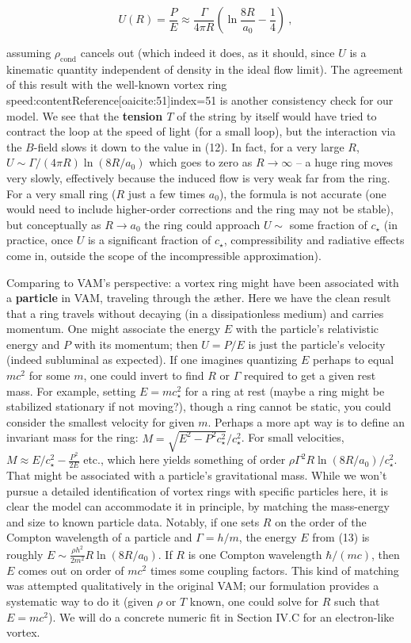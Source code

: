 \documentclass[12pt]{article}
\begin{document}
\[ U(R) = \frac{P}{E} \approx \frac{\Gamma}{4\pi R} \left(\ln\frac{8R}{a_0} - \frac{1}{4}\right)~, \] 

assuming $\rho_{\text{cond}}$ cancels out (which indeed it does, as it should, since $U$ is a kinematic quantity independent of density in the ideal flow limit). The agreement of this result with the well-known vortex ring speed:contentReference[oaicite:51]{index=51} is another consistency check for our model. We see that the \textbf{tension $T$} of the string by itself would have tried to contract the loop at the speed of light (for a small loop), but the interaction via the $B$-field slows it down to the value in (12). In fact, for a very large $R$, $U \sim \Gamma/(4\pi R)\ln(8R/a_0)$ which goes to zero as $R\to \infty$ – a huge ring moves very slowly, effectively because the induced flow is very weak far from the ring. For a very small ring ($R$ just a few times $a_0$), the formula is not accurate (one would need to include higher-order corrections and the ring may not be stable), but conceptually as $R \to a_0$ the ring could approach $U \sim$ some fraction of $c_\star$ (in practice, once $U$ is a significant fraction of $c_\star$, compressibility and radiative effects come in, outside the scope of the incompressible approximation).

Comparing to VAM’s perspective: a vortex ring might have been associated with a \textbf{particle} in VAM, traveling through the æther. Here we have the clean result that a ring travels without decaying (in a dissipationless medium) and carries momentum. One might associate the energy $E$ with the particle’s relativistic energy and $P$ with its momentum; then $U = P/E$ is just the particle’s velocity (indeed subluminal as expected). If one imagines quantizing $E$ perhaps to equal $mc^2$ for some $m$, one could invert to find $R$ or $\Gamma$ required to get a given rest mass. For example, setting $E = m c_\star^2$ for a ring at rest (maybe a ring might be stabilized stationary if not moving?), though a ring cannot be static, you could consider the smallest velocity for given $m$. Perhaps a more apt way is to define an invariant mass for the ring: $M = \sqrt{E^2 - P^2 c_\star^2}/c_\star^2$. For small velocities, $M \approx E/c_\star^2 - \frac{P^2}{2E}$ etc., which here yields something of order $\rho \Gamma^2 R \ln(8R/a_0)/c_\star^2$. That might be associated with a particle’s gravitational mass. While we won’t pursue a detailed identification of vortex rings with specific particles here, it is clear the model can accommodate it in principle, by matching the mass-energy and size to known particle data. Notably, if one sets $R$ on the order of the Compton wavelength of a particle and $\Gamma = h/m$, the energy $E$ from (13) is roughly $E \sim \frac{\rho h^2}{2m^2} R \ln(8R/a_0)$. If $R$ is one Compton wavelength $\hbar/(mc)$, then $E$ comes out on order of $mc^2$ times some coupling factors. This kind of matching was attempted qualitatively in the original VAM; our formulation provides a systematic way to do it (given $\rho$ or $T$ known, one could solve for $R$ such that $E = m c^2$). We will do a concrete numeric fit in Section IV.C for an electron-like vortex.
\end{document}
